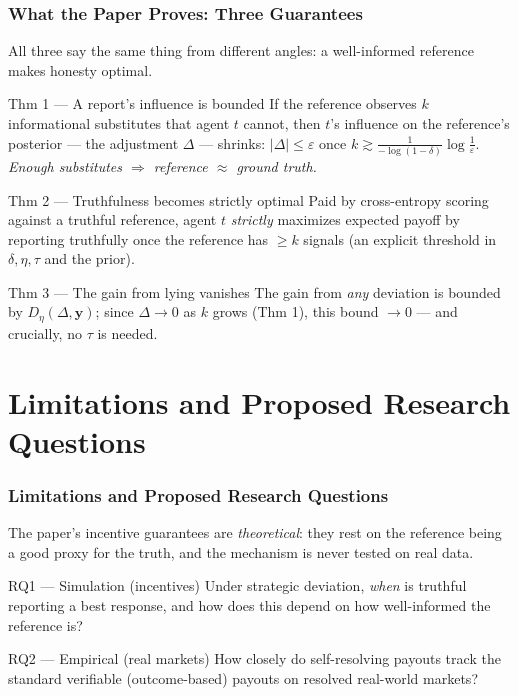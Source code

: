 \documentclass[
	11pt, %
]{beamer}
\begin{document}
\begin{frame}
	\frametitle{What the Paper Proves: Three Guarantees}
	\small
	All three say the same thing from different angles: \alert{a well-informed reference makes honesty optimal.}

	\smallskip
	\begin{block}{Thm 1 --- A report's influence is bounded}
		If the reference observes $k$ informational substitutes that agent $t$ cannot, then $t$'s influence on the reference's posterior --- the adjustment $\Delta$ --- shrinks: $|\Delta|\le\varepsilon$ once $k \gtrsim \frac{1}{-\log(1-\delta)}\log\frac{1}{\varepsilon}$. \emph{Enough substitutes $\Rightarrow$ reference $\approx$ ground truth.}
	\end{block}

	\begin{block}{Thm 2 --- Truthfulness becomes strictly optimal}
		Paid by cross-entropy scoring against a truthful reference, agent $t$ \emph{strictly} maximizes expected payoff by reporting truthfully once the reference has $\ge k$ signals (an explicit threshold in $\delta,\eta,\tau$ and the prior).
	\end{block}

	\begin{block}{Thm 3 --- The gain from lying vanishes}
		The gain from \emph{any} deviation is bounded by $D_\eta(\Delta,\mathbf{y})$; since $\Delta\to0$ as $k$ grows (Thm 1), this bound $\to0$ --- and crucially, no $\tau$ is needed.
	\end{block}
\end{frame}

\section{Limitations and Proposed Research Questions}
\begin{frame}
	\frametitle{Limitations and Proposed Research Questions}

	The paper's incentive guarantees are \emph{theoretical}: they rest on the reference being a good proxy for the truth, and the mechanism is never tested on real data.

	\medskip
	\begin{block}{RQ1 --- Simulation (incentives)}
		Under strategic deviation, \emph{when} is truthful reporting a best response, and how does this depend on how well-informed the reference is?
	\end{block}

	\begin{block}{RQ2 --- Empirical (real markets)}
		How closely do self-resolving payouts track the standard verifiable (outcome-based) payouts on resolved real-world markets?
	\end{block}
\end{frame}
\end{document}
